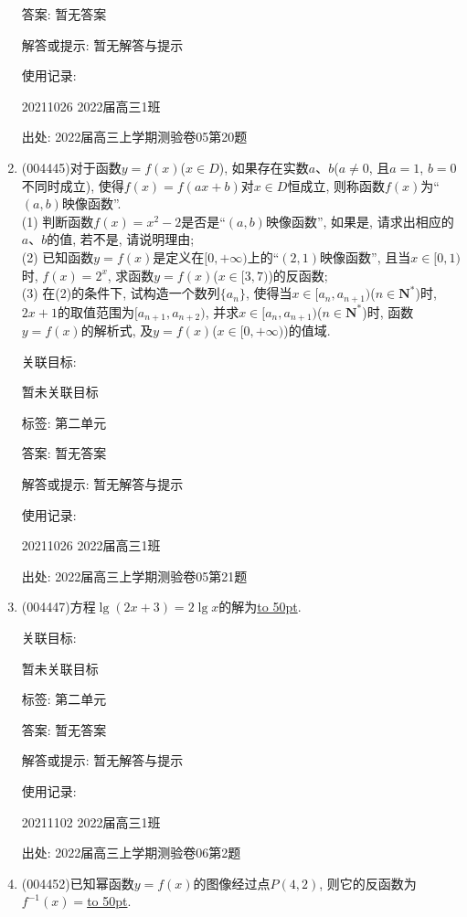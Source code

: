 \documentclass[10pt,a4paper]{article}
\newcommand{\blank}[1]{\underline{\hbox to #1pt{}}}
\begin{document}
\begin{enumerate}[1.]
答案: 暂无答案

解答或提示: 暂无解答与提示

使用记录:

20211026	2022届高三1班			


出处: 2022届高三上学期测验卷05第20题
\item { (004445)}对于函数$y=f(x)$($x\in D$), 如果存在实数$a$、$b$($a\ne 0$, 且$a=1$, $b=0$不同时成立), 使得$f(x)=f(ax+b)$对$x\in D$恒成立, 则称函数$f(x)$为``$(a,b)$映像函数''.\\
(1) 判断函数$f(x)=x^2-2$是否是``$(a,b)$映像函数'', 如果是, 请求出相应的$a$、$b$的值, 若不是, 请说明理由;\\
(2) 已知函数$y=f(x)$是定义在$[0,+\infty)$上的``$(2,1)$映像函数'', 且当$x\in [0,1)$时, $f(x)=2^x$, 求函数$y=f(x)$($x\in [3,7)$)的反函数;\\
(3) 在(2)的条件下, 试构造一个数列$\{a_n\}$, 使得当$x\in [a_n,{a_{n+1}})$($n\in \mathbf{N}^*$)时, $2x+1$的取值范围为$[{a_{n+1}},{a_{n+2}})$, 并求$x\in [a_n,{a_{n+1}})$($n\in \mathbf{N}^*$)时, 函数$y=f(x)$的解析式, 及$y=f(x)$($x\in [0,+\infty)$)的值域.


关联目标:

暂未关联目标



标签: 第二单元

答案: 暂无答案

解答或提示: 暂无解答与提示

使用记录:

20211026	2022届高三1班			


出处: 2022届高三上学期测验卷05第21题
\item { (004447)}方程$\lg(2x+3)=2\lg x$的解为\blank{50}.


关联目标:

暂未关联目标



标签: 第二单元

答案: 暂无答案

解答或提示: 暂无解答与提示

使用记录:

20211102	2022届高三1班	


出处: 2022届高三上学期测验卷06第2题
\item { (004452)}已知幂函数$y=f(x)$的图像经过点$P(4,2)$, 则它的反函数为$f^{-1}(x)=$\blank{50}.



\end{enumerate}
\end{document}
